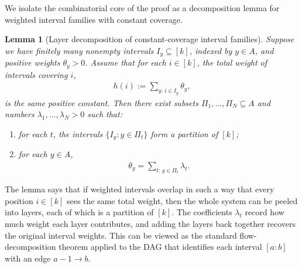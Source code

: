 \documentclass{article}
\theoremstyle{plain}
\newtheorem{lemma}[theorem]{Lemma}
\theoremstyle{definition}
\theoremstyle{plain}
\begin{document}
We isolate the combinatorial core of the proof as a decomposition lemma for weighted interval families with constant coverage.

\begin{lemma}[Layer decomposition of constant-coverage interval families]
\label{lem:constant-coverage-interval-decomposition}
Suppose we have finitely many nonempty intervals $I_y\subseteq [k]$, indexed by $y\in A$, and positive weights $\theta_y>0$. Assume that for each $i\in [k]$, the total weight of intervals covering $i$,
\begin{align*}
    h(i):=\sum_{y:\, i\in I_y}\theta_y,
\end{align*}
is the same positive constant. Then there exist subsets $\Pi_1,\dots,\Pi_N\subseteq A$ and numbers $\lambda_1,\dots,\lambda_N>0$ such that:
\begin{enumerate}
\item for each $t$, the intervals $\{I_y:y\in \Pi_t\}$ form a partition of $[k]$;
\item for each $y\in A$,
\begin{align*}
    \theta_y=\sum_{t:\, y\in \Pi_t}\lambda_t.
\end{align*}
\end{enumerate}
\end{lemma}
The lemma says that if weighted intervals overlap in such a way that every position $i \in [k]$ sees the same total weight, then the whole system can be peeled into layers, each of which is a partition of $[k]$. The coefficients $\lambda_t$ record how much weight each layer contributes, and adding the layers back together recovers the original interval weights. This can be viewed as the standard flow-decomposition theorem \cite{Ahuja1993NetworkFlows} applied to the DAG that identifies each interval $[a:b]$ with an edge $a-1\to b$.
\end{document}
